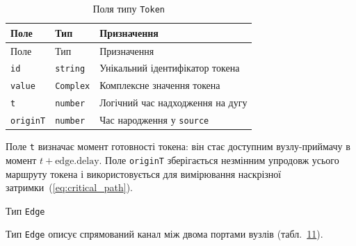\begin{longtable}[]{@{}
  >{\raggedright\arraybackslash}p{}
  >{\raggedright\arraybackslash}p{}
  >{\raggedright\arraybackslash}p{}@{}}
\caption{\protect{}\label{tab:token}{}Поля типу
\protect\texttt{Token}}\tabularnewline
\toprule\noalign{}
\begin{minipage}[b]{\linewidth}\raggedright
Поле
\end{minipage} & \begin{minipage}[b]{\linewidth}\raggedright
Тип
\end{minipage} & \begin{minipage}[b]{\linewidth}\raggedright
Призначення
\end{minipage} \\
\midrule\noalign{}
\endfirsthead
\toprule\noalign{}
\begin{minipage}[b]{\linewidth}\raggedright
Поле
\end{minipage} & \begin{minipage}[b]{\linewidth}\raggedright
Тип
\end{minipage} & \begin{minipage}[b]{\linewidth}\raggedright
Призначення
\end{minipage} \\
\midrule\noalign{}
\endhead
\bottomrule\noalign{}
\endlastfoot
\texttt{id} & \texttt{string} & Унікальний ідентифікатор токена \\
\texttt{value} & \texttt{Complex} & Комплексне значення токена \\
\texttt{t} & \texttt{number} & Логічний час надходження на дугу \\
\texttt{originT} & \texttt{number} & Час народження у \texttt{source} \\
\end{longtable}

Поле \texttt{t} визначає момент готовності токена: він стає доступним
вузлу-приймачу в момент \(t + \text{edge.delay}\). Поле \texttt{originT}
зберігається незмінним упродовж усього маршруту токена і
використовується для вимірювання наскрізної
затримки~(\hyperref[eq:critical_path]{{[}eq:critical\_path{]}}).

Тип \texttt{Edge}

Тип \texttt{Edge} описує спрямований канал між двома портами вузлів
(табл.~\hyperref[tab:edge]{11}).

